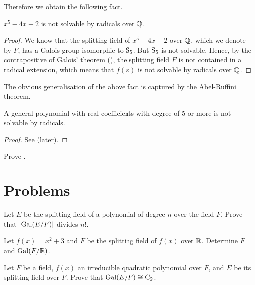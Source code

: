 Therefore we obtain the following fact.

\begin{proposition}
    $x^5 - 4x - 2$ is not solvable by radicals over $\mathbb{Q}$.
\end{proposition}
\begin{proof}
    We know that the splitting field of $x^5 - 4x - 2$ over $\mathbb{Q}$, which we denote by $F$, has a Galois group isomorphic to $\mathrm{S}_{5}$. But $\mathrm{S}_{5}$ is not solvable. Hence, by the contrapositive of Galois' theorem (), the splitting field $F$ is not contained in a radical extension, which means that $f(x)$ is not solvable by radicals over $\mathbb{Q}$.
\end{proof}

The obvious generalisation of the above fact is captured by the Abel-Ruffini theorem.

\begin{theorem}\label{thrm-abel-ruffini}
    A general polynomial with real coefficients with degree of 5 or more is not solvable by radicals.
\end{theorem}
\begin{proof}
    See  (later).
\end{proof}

\begin{exercise}\label{exercise-prove-abel-ruffini}
    Prove .
\end{exercise}

\newpage

\section{Problems}
\begin{problem}
    Let $E$ be the splitting field of a polynomial of degree $n$ over the field $F$. Prove that $|\mathrm{Gal}(E/F)|$ divides $n!$.
\end{problem}

\begin{problem}
    Let $f(x) = x^2 + 3$ and $F$ be the splitting field of $f(x)$ over $\mathbb{R}$. Determine $F$ and $\mathrm{Gal}(F/\mathbb{R})$.
\end{problem}

\begin{problem}
    Let $F$ be a field, $f(x)$ an irreducible quadratic polynomial over $F$, and $E$ be its splitting field over $F$. Prove that $\mathrm{Gal}(E/F) \cong \mathrm{C}_{2}$.
\end{problem}

